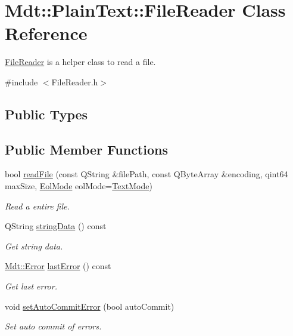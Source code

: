 \hypertarget{class_mdt_1_1_plain_text_1_1_file_reader}{}\section{Mdt\+:\+:Plain\+Text\+:\+:File\+Reader Class Reference}
\label{class_mdt_1_1_plain_text_1_1_file_reader}


\hyperlink{class_mdt_1_1_plain_text_1_1_file_reader}{File\+Reader} is a helper class to read a file.  




{\ttfamily \#include $<$File\+Reader.\+h$>$}

\subsection*{Public Types}
\subsection*{Public Member Functions}
\begin{DoxyCompactItemize}
\item 
bool \hyperlink{class_mdt_1_1_plain_text_1_1_file_reader_ae382363945e70dd800d5a9a41442795f}{read\+File} (const Q\+String \&file\+Path, const Q\+Byte\+Array \&encoding, qint64 max\+Size, \hyperlink{class_mdt_1_1_plain_text_1_1_file_reader_ad9b4b7e046f899c9d13e19434d68ef10}{Eol\+Mode} eol\+Mode=\hyperlink{class_mdt_1_1_plain_text_1_1_file_reader_ad9b4b7e046f899c9d13e19434d68ef10a80c0cede59c86d5daac618c3efd559cd}{Text\+Mode})
\begin{DoxyCompactList}\small\item\em Read a entire file. \end{DoxyCompactList}\item 
Q\+String \hyperlink{class_mdt_1_1_plain_text_1_1_file_reader_a9453c731da657581d58188106461e32b}{string\+Data} () const 
\begin{DoxyCompactList}\small\item\em Get string data. \end{DoxyCompactList}\item 
\hyperlink{class_mdt_1_1_error}{Mdt\+::\+Error} \hyperlink{class_mdt_1_1_plain_text_1_1_file_reader_aa74ba00e8fad5c4834dc63a354416192}{last\+Error} () const 
\begin{DoxyCompactList}\small\item\em Get last error. \end{DoxyCompactList}\item 
void \hyperlink{class_mdt_1_1_plain_text_1_1_file_reader_a3183d1d629a19353d3d0e1c2a238cc2f}{set\+Auto\+Commit\+Error} (bool auto\+Commit)
\begin{DoxyCompactList}\small\item\em Set auto commit of errors. \end{DoxyCompactList}\end{DoxyCompactItemize}


